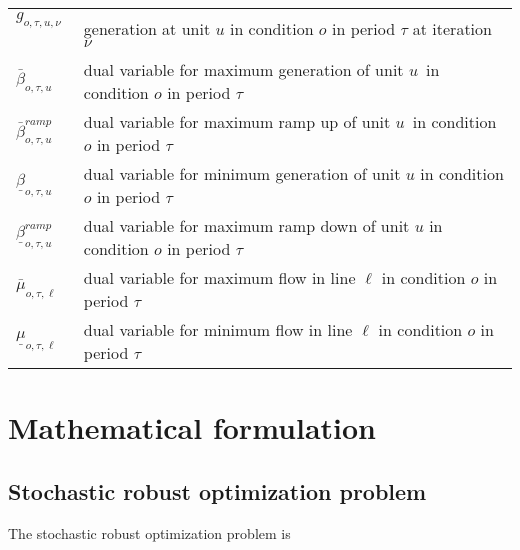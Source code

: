 \begin{supertabular}{p{1.5cm} p{6.5cm}}
	$g_{o, \tau, u, \nu}$  				& generation at unit $u$ in condition $o$ in period $\tau$ at iteration $\nu$ \\
	$\bar{\beta}_{o, \tau, u}$ 			& dual variable for maximum generation of unit $u$ in condition $o$ in period $\tau$ \\
	$\bar{\beta}_{o, \tau, u}^{ramp}$ 	& dual variable for maximum ramp up of unit $u$ in condition $o$ in period $\tau$ \\
	$\underline{\beta}_{o, \tau, u}$ 	& dual variable for minimum generation of unit $u$ in condition $o$ in period $\tau$ \\
	$\underline{\beta}_{o, \tau, u}^{ramp}$& dual variable for maximum ramp down of unit $u$ in condition $o$ in period $\tau$ \\
	$\bar{\mu}_{o, \tau, \ell}$ 		& dual variable for maximum flow in line $\ell$ in condition $o$ in period $\tau$ \\
	$\underline{\mu}_{o, \tau, \ell}$ 	& dual variable for minimum flow in line $\ell$ in condition $o$ in period $\tau$
\end{supertabular}

\section{Mathematical formulation}
\label{section_formulation}

\subsection{Stochastic robust optimization problem}

The stochastic robust optimization problem is

